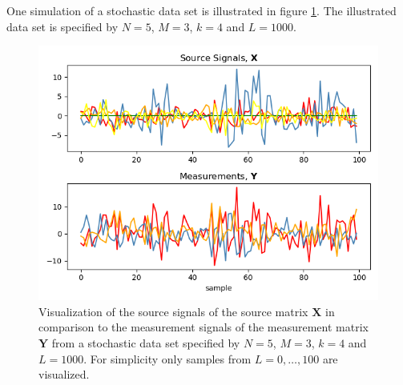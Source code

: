 One simulation of a stochastic data set is illustrated in figure \ref{fig:AR}. 
The illustrated data set is specified by $N = 5$, $M = 3$, $k = 4$ and $L = 1000$.
\begin{figure}[H]
\centering
\includegraphics[scale=0.5]{figures/ch_6/AR_data.png}
\caption{Visualization of the source signals of the source matrix $\mathbf{X}$ in comparison to the measurement signals of the measurement matrix $\mathbf{Y}$ from a stochastic data set specified by $N = 5$, $M = 3$, $k = 4$ and $L=1000$. For simplicity only samples from $L = 0, \dots, 100$ are visualized.}
\label{fig:AR}
\end{figure}
\noindent

